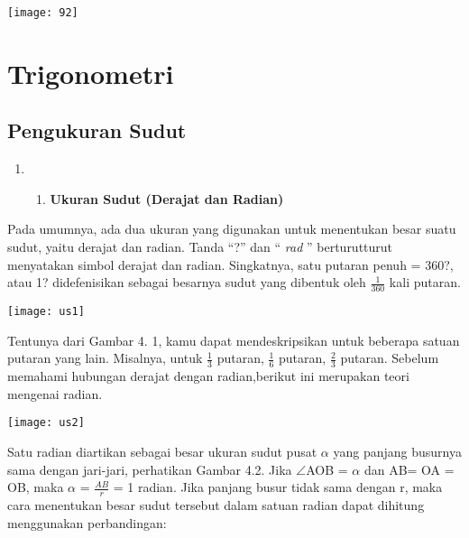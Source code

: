 \documentclass[11pt,fleqn]{book} %
\begin{document}
\begin{center}
\texttt{[image: 92]}
\end{center}

\noindent




\chapter{Trigonometri}

\section{Pengukuran Sudut}


\begin{enumerate}
\item \begin{enumerate}
\item  \textbf{Ukuran Sudut  (Derajat dan Radian) }
\end{enumerate}
\end{enumerate}

Pada umumnya, ada dua ukuran yang digunakan untuk menentukan besar suatu sudut, yaitu derajat dan radian.  Tanda ``?'' dan `` \textit{rad} '' berturutturut menyatakan simbol derajat dan radian. Singkatnya, satu putaran penuh = 360?, atau 1? didefenisikan sebagai besarnya sudut yang dibentuk oleh $\frac{1}{360}$ kali putaran.

\texttt{[image: us1]}

Tentunya dari Gambar 4. 1, kamu dapat mendeskripsikan untuk beberapa satuan putaran yang lain. Misalnya, untuk $\frac{1}{3}$ putaran, $\frac{1}{6}$ putaran, $\frac{2}{3}$ putaran. Sebelum memahami hubungan derajat dengan radian,berikut ini merupakan teori mengenai radian.

\texttt{[image: us2]}

Satu radian diartikan sebagai besar ukuran sudut pusat $\alpha$ yang panjang busurnya sama dengan jari-jari, perhatikan Gambar 4.2. Jika $\mathrm{\angle}$AOB = $\alpha$ dan AB= OA = OB, maka $\alpha$ = $\frac{AB}{r}$  = 1 radian. Jika panjang busur tidak sama dengan r, maka cara menentukan besar sudut tersebut dalam satuan  radian dapat dihitung menggunakan perbandingan:
\end{document}

